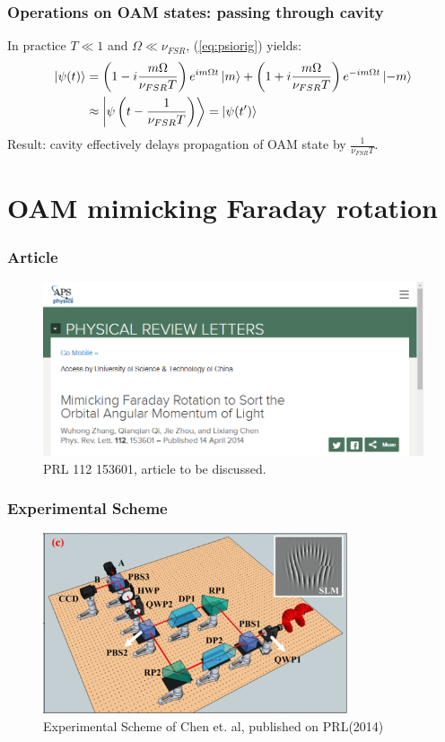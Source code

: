 \documentclass[amssymb, amsmath]{beamer}
\begin{document}
\begin{frame}
\frametitle{Operations on OAM states: passing through cavity}

    In practice $T\ll1$ and $\Omega\ll\nu_{FSR}$, (\ref{eq:psiorig}) yields:
\begin{align}
    \ket{\psi(t)} &= \left(1-i\frac{m \Omega}{\nu_{FSR}T}\right)e^{i m \Omega t}\ket{m}
    +\left(1+i\frac{m \Omega}{\nu_{FSR}T}\right)e^{-i m \Omega t}\ket{-m} \\
    &\approx \Ket{\psi\left(t-\frac{1}{\nu_{FSR} T}\right)}=\ket{\psi(t^\prime)}
    \end{align}
\textcolor{midori}{Result: cavity effectively delays propagation of OAM state by $\frac{1}{\nu_{FSR} T}$}.

\end{frame}

\section{OAM mimicking Faraday rotation}

\begin{frame}
\frametitle{Article}

\begin{figure}
    \centering
    \includegraphics[width=0.80\columnwidth]{fig/title.png}
    \caption{PRL 112 153601, article to be discussed.}
\end{figure}

\end{frame}

\begin{frame}
\frametitle{Experimental Scheme}
\begin{figure}
    \centering
    \includegraphics[width=0.80\textwidth]{fig/scheme_large.png}
    \caption{Experimental Scheme of Chen et. al, published on PRL(2014)}
    \label{fig:scheme_PRL}
\end{figure}

\end{frame}
\end{document}
